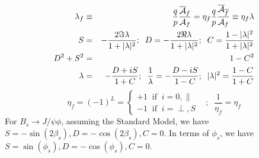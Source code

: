 \documentclass[a4paper,10pt,twosided]{article}
\begin{document}
\begin{eqnarray}
   \lambda_f &\equiv& \frac{q}{p}\frac{\overline{\cal A}_f}{{\cal A}_f} = \eta_f\frac{q}{p} \frac{\overline{\cal A}_{\overline{f}}}{{\cal A}_f} \equiv \eta_f \lambda\\
   S &=& -\frac{2 \Im \lambda}{1+|\lambda|^2};\;\; D = -\frac{2 \Re \lambda}{1+|\lambda|^2};\;\; C = \frac{1-|\lambda|^2 }{1+|\lambda|^2}\\
   D^2+S^2 & = & 1 - C^2 \\
   \lambda & = & - \frac{D+iS}{1+C};\;\; \frac{1}{\lambda}  =  -\frac{D-iS}{1-C};\;\; |\lambda|^2 = \frac{ 1-C }{ 1+C }
\end{eqnarray}
\begin{equation}
  \eta_f = (-1)^L = \left\{ \begin{array}{l} +1 \;\; \mathrm{if}\;\; i=0,\parallel  \\ -1\;\; \mathrm{if}\;\; i=\perp,S \end{array} \right. \;\;\;;\;\; \frac{1}{\eta_f}=\eta_f
  \label{eq:etadef}
\end{equation}
For $B_s\rightarrow J/\psi\phi$, assuming the Standard Model,  we have $S=-\sin(2\beta_s),D=-\cos(2\beta_s),C=0$.
In terms of $\phi_s$, we have $S= \sin(\phi_s),D=-\cos(\phi_s),C=0$.
\end{document}
